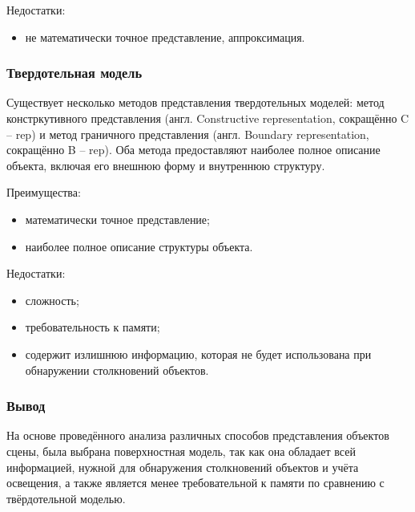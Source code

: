Недостатки:
\begin{itemize}
    \item не математически точное представление, аппроксимация.
\end{itemize}

\subsubsection{Твердотельная модель}

Существует несколько методов представления твердотельных моделей: метод констркутивного представления (англ. Constructive representation, сокращённо C -- rep) и метод граничного представления (англ. Boundary representation, сокращённо B -- rep). %
Оба метода предоставляют наиболее полное описание объекта, включая его внешнюю форму и внутреннюю структуру.

Преимущества:
\begin{itemize}
    \item математически точное представление;
    \item наиболее полное описание структуры объекта.
\end{itemize}

Недостатки:
\begin{itemize}
    \item сложность;
    \item требовательность к памяти;
    \item содержит излишнюю информацию, которая не будет использована при обнаружении столкновений объектов.
\end{itemize}

\subsubsection*{Вывод}

На основе проведённого анализа различных способов представления объектов сцены, была выбрана поверхностная модель, так как она обладает всей информацией, нужной для обнаружения столкновений объектов и учёта освещения, а также является менее требовательной к памяти по сравнению с твёрдотельной моделью.



